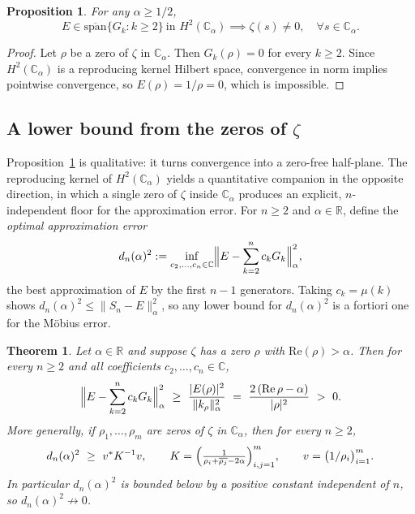 \documentclass[11pt]{extarticle}
\numberwithin{equation}{section}
\theoremstyle{plain}
\newtheorem{theorem}{Theorem}[section]
\newtheorem{proposition}{Proposition}[section]
\newtheorem{remark}{Remark}[section]
\theoremstyle{definition}
\begin{document}
\begin{proposition}\label{main-prop}
For any $\alpha \geq 1/2$,
\[
E \in \overline{\mathrm{span}}\{G_k : k \geq 2\} \ \text{in } H^2(\mathbb{C}_\alpha) 
\implies \zeta(s) \neq 0, \quad \forall s \in \mathbb{C}_\alpha.
\]
\end{proposition}

\begin{proof}
Let $\rho$ be a zero of $\zeta$ in $\mathbb{C}_\alpha$. Then $G_k(\rho) = 0$ 
for every $k \geq 2$. Since $H^2(\mathbb{C}_\alpha)$ is a reproducing kernel
Hilbert space, convergence in norm implies pointwise convergence, so
$E(\rho) = 1/\rho = 0$, which is impossible.
\end{proof}


\subsection{A lower bound from the zeros of $\zeta$}\label{subsec:lower}

Proposition~\ref{main-prop} is qualitative: it turns convergence into a zero-free
half-plane. The reproducing kernel of $H^2(\mathbb{C}_\alpha)$ yields a quantitative
companion in the opposite direction, in which a single zero of $\zeta$ inside
$\mathbb{C}_\alpha$ produces an explicit, $n$-independent floor for the
approximation error. For $n \geq 2$ and $\alpha \in \mathbb{R}$, define the
\emph{optimal approximation error}
\[
d_n(\alpha)^2 := \inf_{c_2, \dots, c_n \in \mathbb{C}}
\Bigl\| E - \sum_{k=2}^{n} c_k G_k \Bigr\|^2_\alpha,
\]
the best approximation of $E$ by the first $n-1$ generators. Taking
$c_k = \mu(k)$ shows $d_n(\alpha)^2 \leq \|S_n - E\|^2_\alpha$, so any lower bound
for $d_n(\alpha)^2$ is a fortiori one for the Möbius error.

\begin{theorem}\label{thm:lower}
Let $\alpha \in \mathbb{R}$ and suppose $\zeta$ has a zero $\rho$ with
$\mathrm{Re}(\rho) > \alpha$. Then for every $n \geq 2$ and all coefficients
$c_2, \dots, c_n \in \mathbb{C}$,
\[
\Bigl\| E - \sum_{k=2}^{n} c_k G_k \Bigr\|^2_\alpha
\ \geq\ \frac{|E(\rho)|^2}{\|k_\rho\|^2_\alpha}
\ =\ \frac{2\,(\mathrm{Re}\,\rho - \alpha)}{|\rho|^2}\ >\ 0.
\]
More generally, if $\rho_1, \dots, \rho_m$ are zeros of $\zeta$ in
$\mathbb{C}_\alpha$, then for every $n \geq 2$,
\[
d_n(\alpha)^2 \ \geq\ v^{*} K^{-1} v, \qquad
K = \Bigl( \tfrac{1}{\rho_i + \overline{\rho_j} - 2\alpha} \Bigr)_{i,j=1}^{m}, \qquad
v = \bigl( 1/\rho_i \bigr)_{i=1}^{m}.
\]
In particular $d_n(\alpha)^2$ is bounded below by a positive constant independent
of $n$, so $d_n(\alpha)^2 \not\to 0$.
\end{theorem}
\end{document}

